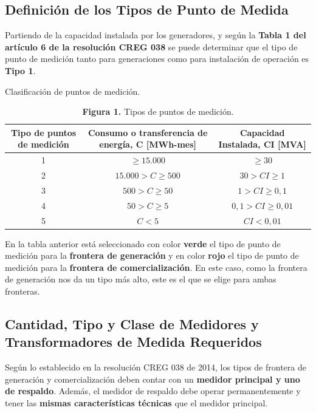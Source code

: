 \subsection{Definición de los Tipos de Punto de Medida} \label{subsec:tipos_punto_medida}
Partiendo de la capacidad instalada por los generadores, y según la \textbf{Tabla 1 del artículo 6 de la resolución CREG 038} se puede determinar que el tipo de punto de medición tanto para generaciones como para instalación de operación es \textbf{Tipo 1}.

\begin{table}[t]
  \centering
  \caption{Clasificación de puntos de medición.}
  \label{tab:clasificacion_puntos_medicion}
  \begin{tabular}{ccc}
    \toprule
    \textbf{Tipo de puntos de medición} & \textbf{Consumo o transferencia de energía, C [MWh-mes]} & \textbf{Capacidad Instalada, CI [MVA]} \\
    \midrule
    1 & $\ge 15.000$ \cellcolor{lightgreen} & $\ge 30$ \cellcolor{lightgreen} \\
    2 & $15.000 > C \ge 500$ & $30 > CI \ge 1$ \\
    3 & $500 > C \ge 50$ \cellcolor{lightred} & $1 > CI \ge 0,1$ \cellcolor{lightred} \\
    4 & $50 > C \ge 5$ & $0,1 > CI \ge 0,01$ \\
    5 & $C < 5$ & $CI < 0,01$ \\
    \bottomrule
  \end{tabular}
  \caption*{\textbf{Figura 1.} Tipos de puntos de medición.}
\end{table}

En la tabla anterior está seleccionado con color \textbf{verde} el tipo de punto de medición para la \textbf{frontera de generación} y en color \textbf{rojo} el tipo de punto de medición para la \textbf{frontera de comercialización}. En este caso, como la frontera de generación nos da un tipo más alto, este es el que se elige para ambas fronteras.

\subsection{Cantidad, Tipo y Clase de Medidores y Transformadores de Medida Requeridos} \label{subsec:cantidad_clase_medidores}
Según lo establecido en la resolución CREG 038 de 2014, los tipos de frontera de generación y comercialización deben contar con un \textbf{medidor principal y uno de respaldo}. Además, el medidor de respaldo debe operar permanentemente y tener las \textbf{mismas características técnicas} que el medidor principal.


